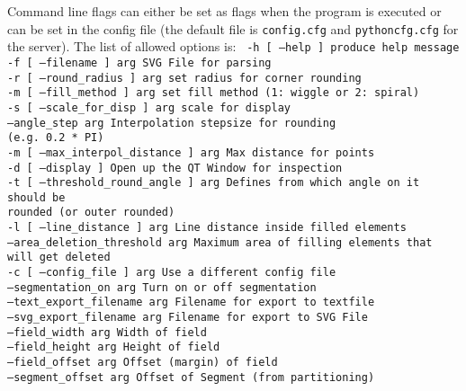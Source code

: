 Command line flags can either be set as flags when the program is executed or can be set in the config file (the default file is \texttt{config.cfg} and \texttt{pythoncfg.cfg} for the server).
The list of allowed options is:
\texttt{
  -h [ --help ]                        produce help message\\
  -f [ --filename ] arg                SVG File for parsing\\
  -r [ --round\_radius ] arg            set radius for corner rounding\\
  -m [ --fill\_method ] arg             set fill method (1: wiggle or 2: spiral)\\
  -s [ --scale\_for\_disp ] arg          scale for display\\
  --angle\_step arg                     Interpolation stepsize for rounding \\
                                       (e.g. 0.2 * PI)\\
  -m [ --max\_interpol\_distance ] arg   Max distance for points \\
  -d [ --display ]                     Open up the QT Window for inspection\\
  -t [ --threshold\_round\_angle ] arg   Defines from which angle on it should be\\
                                       rounded (or outer rounded)\\
  -l [ --line\_distance ] arg           Line distance inside filled elements\\
  --area\_deletion\_threshold arg        Maximum area of filling elements that \\
                                       will get deleted \\
  -c [ --config\_file ] arg             Use a different config file\\
  --segmentation\_on arg                Turn on or off segmentation\\
  --text\_export\_filename arg          Filename for export to textfile\\
  --svg\_export\_filename arg            Filename for export to SVG File\\
  --field\_width arg                    Width of field\\
  --field\_height arg                   Height of field\\
  --field\_offset arg                   Offset (margin) of field\\
  --segment\_offset arg                 Offset of Segment (from partitioning)\\
}
